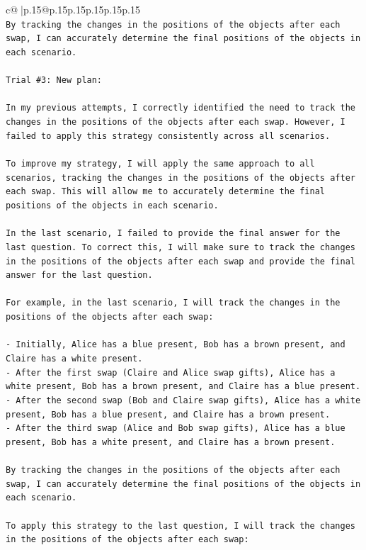 \documentclass{article}
\begin{document}
{\begin{supertabular}{c@{$\;$}|p{.15\linewidth}@{}p{.15\linewidth}p{.15\linewidth}p{.15\linewidth}p{.15\linewidth}p{.15\linewidth}}
{{{\\ 
\texttt{By tracking the changes in the positions of the objects after each swap, I can accurately determine the final positions of the objects in each scenario.} \\
\\ 
\texttt{Trial \#3: New plan: } \\
\\ 
\texttt{In my previous attempts, I correctly identified the need to track the changes in the positions of the objects after each swap. However, I failed to apply this strategy consistently across all scenarios. } \\
\\ 
\texttt{To improve my strategy, I will apply the same approach to all scenarios, tracking the changes in the positions of the objects after each swap. This will allow me to accurately determine the final positions of the objects in each scenario.} \\
\\ 
\texttt{In the last scenario, I failed to provide the final answer for the last question. To correct this, I will make sure to track the changes in the positions of the objects after each swap and provide the final answer for the last question.} \\
\\ 
\texttt{For example, in the last scenario, I will track the changes in the positions of the objects after each swap:} \\
\\ 
\texttt{{-} Initially, Alice has a blue present, Bob has a brown present, and Claire has a white present.} \\
\texttt{{-} After the first swap (Claire and Alice swap gifts), Alice has a white present, Bob has a brown present, and Claire has a blue present.} \\
\texttt{{-} After the second swap (Bob and Claire swap gifts), Alice has a white present, Bob has a blue present, and Claire has a brown present.} \\
\texttt{{-} After the third swap (Alice and Bob swap gifts), Alice has a blue present, Bob has a white present, and Claire has a brown present.} \\
\\ 
\texttt{By tracking the changes in the positions of the objects after each swap, I can accurately determine the final positions of the objects in each scenario.} \\
\\ 
\texttt{To apply this strategy to the last question, I will track the changes in the positions of the objects after each swap:} \\
}}}
\end{supertabular}}
\end{document}
